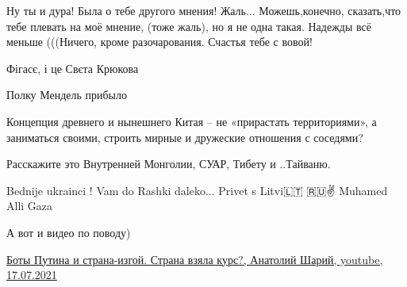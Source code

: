 \begin{itemize}
 

Ну ты и дура! Была о тебе другого мнения! Жаль... Можешь,конечно, сказать,что
тебе плевать на моё мнение, (тоже жаль), но я не одна такая. Надежды всё меньше
(((Ничего, кроме разочарования. Счастья тебе с вовой!

 
Фігасє, і це Свєта Крюкова

 
Полку Мендель прибыло

 

Концепция древнего и нынешнего Китая – не «прирастать территориями», а
заниматься своими, строить мирные и дружеские отношения с соседями?

Расскажите это Внутренней Монголии, СУАР, Тибету и ..Тайваню.

 
Bednije ukrainci ! Vam do Rashki daleko...
Privet s Litvi🇱🇹 🇷🇺✌
Muhamed Alli Gaza\Laughey[1.0][white]

 
А вот и видео по поводу)

\href{https://youtu.be/RlH_kf_lUS8}{%
Боты Путина и страна-изгой. Страна взяла курс?, Анатолий Шарий, youtube, 17.07.2021%
}


\end{itemize}
